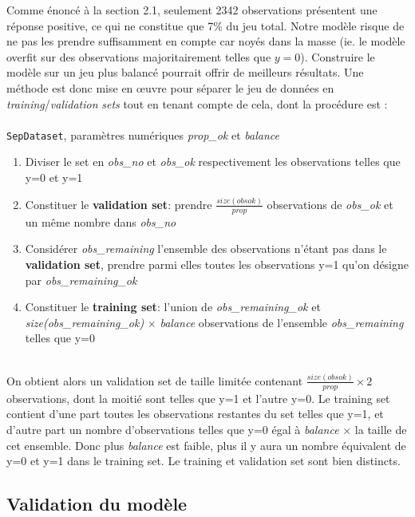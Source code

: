 \documentclass[]{article}
\begin{document}
Comme énoncé à la section 2.1, seulement 2342 observations présentent une réponse positive, ce qui ne constitue que 7\% du jeu total. Notre modèle risque de ne pas les prendre suffisamment en compte car noyés dans la masse (ie. le modèle overfit sur des observations majoritairement telles que $y=0$). Construire le modèle sur un jeu plus balancé pourrait offrir de meilleurs résultats. Une méthode est donc mise en œuvre pour séparer le jeu de données en \textit{training}/\textit{validation} \textit{sets }tout en tenant compte de cela, dont la procédure est :\\
~\\
\indent \texttt{SepDataset}, paramètres numériques \textit{prop\_ok} et \textit{balance}  
\begin{enumerate}
\item Diviser le set en \textit{obs\_no} et \textit{obs\_ok} respectivement les observations telles que y=0 et y=1 
\item Constituer le \textbf{validation set}: prendre $\frac{size(obsok)}{prop}$ observations de \textit{obs\_ok} et un même nombre dans \textit{obs\_no}
\item Considérer \textit{obs\_remaining} l'ensemble des observations n'étant pas dans le \textbf{validation set}, prendre parmi elles toutes les observations y=1 qu'on désigne par \textit{obs\_remaining\_ok} 
\item Constituer le \textbf{training set}: l'union de \textit{obs\_remaining\_ok} et \textit{size(\textit{obs\_remaining\_ok})} $\times$ \textit{balance} observations de l'ensemble \textit{obs\_remaining} telles que y=0
\end{enumerate}
~\\
On obtient alors un validation set de taille limitée contenant $\frac{size(obsok)}{prop} \times 2$ observations, dont la moitié sont telles que y=1 et l'autre y=0. Le training set contient d'une part toutes les observations restantes du set telles que y=1, et d'autre part un nombre d'observations telles que y=0 égal à \textit{balance} $\times$ la taille de cet ensemble. Donc plus \textit{balance} est faible, plus il y aura un nombre équivalent de y=0 et y=1 dans le training set. Le training et validation set sont bien distincts.

\subsection{Validation du modèle}
\end{document}
